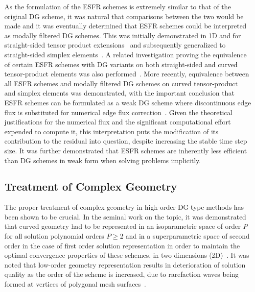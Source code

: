 \documentclass[12pt,Bold,letterpaper,TexShade]{mcgilletdclass}
\numberwithin{equation}{section}
\begin{document}
As the formulation of the ESFR schemes is extremely similar to that of the original DG scheme, it was natural that comparisons between the two would be made and it was eventually determined that ESFR schemes could be interpreted as modally filtered DG schemes. This was initially demonstrated in 1D and for straight-sided tensor product extensions~\cite{allaneau2011} and subsequently generalized to straight-sided simplex elements~\cite{williams2014a}. A related investigation proving the equivalence of certain ESFR schemes with DG variants on both straight-sided and curved tensor-product elements was also performed~\cite{degrazia2014,mengaldo2015}. More recently, equivalence between all ESFR schemes and modally filtered DG schemes on curved tensor-product and simplex elements was demonstrated, with the important conclusion that ESFR schemes can be formulated as a weak DG scheme where discontinuous edge flux is substituted for numerical edge flux correction~\cite{zwanenburg2016}. Given the theoretical justifications for the numerical flux and the significant computational effort expended to compute it, this interpretation puts the modification of its contribution to the residual into question, despite increasing the stable time step size. It was further demonstrated that ESFR schemes are inherently less efficient than DG schemes in weak form when solving problems implicitly.

\subsection{Treatment of Complex Geometry}

The proper treatment of complex geometry in high-order DG-type methods has been shown to be crucial. In the seminal work on the topic, it was demonstrated that curved geometry had to be represented in an isoparametric space of order $P$ for all solution polynomial orders $P \ge 2$ and in a superparametric space of second order in the case of first order solution representation in order to maintain the optimal convergence properties of these schemes, in two dimensions (2D)~\cite{bassi1997}. It was noted that low-order geometry representation results in deterioration of solution quality as the order of the scheme is increased, due to rarefaction waves being formed at vertices of polygonal mesh surfaces~\cite{krivodonova2006}. 
\end{document}
